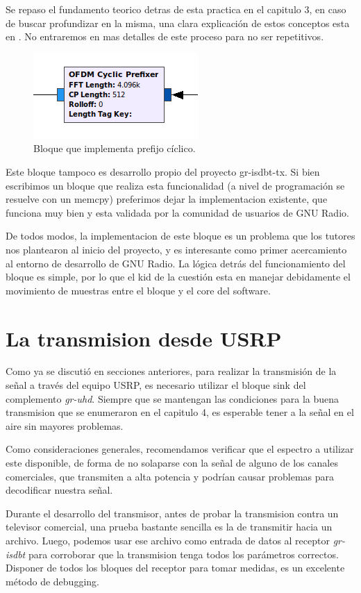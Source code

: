 Se repaso el fundamento teorico detras de esta practica en el capitulo 3, en caso de buscar profundizar en la misma, una clara explicación de estos conceptos esta en \cite{gr-isdbt}. No entraremos en mas detalles de este proceso para no ser repetitivos.

\begin{figure}[!h]
	\centering
	\includegraphics[scale=0.5]{figuras/cap05/cp}
	\caption{\label{f:cp} Bloque que implementa prefijo cíclico.}
\end{figure}

Este bloque tampoco es desarrollo propio del proyecto gr-isdbt-tx. Si bien escribimos un bloque que realiza esta funcionalidad (a nivel de programación se resuelve con un memcpy) preferimos dejar la implementacion existente, que funciona muy bien y esta validada por la comunidad de usuarios de GNU Radio.

De todos modos, la implementacion de este bloque es un problema que los tutores nos plantearon al inicio del proyecto, y es interesante como primer acercamiento al entorno de desarrollo de GNU Radio. La lógica detrás del funcionamiento del bloque es simple, por lo que el kid de la cuestión esta en manejar debidamente el movimiento de muestras entre el bloque y el core del software.

\section{La transmision desde USRP}

Como ya se discutió en secciones anteriores, para realizar la transmisión de la señal a través del equipo USRP, es necesario utilizar el bloque sink del complemento \textit{gr-uhd}. Siempre que se mantengan las condiciones para la buena transmision que se enumeraron en el capitulo 4, es esperable tener a la señal en el aire sin mayores problemas. 

Como consideraciones generales, recomendamos verificar que el espectro a utilizar este disponible, de forma de no solaparse con la señal de alguno de los canales comerciales, que transmiten a alta potencia y podrían causar problemas para decodificar nuestra señal.

Durante el desarrollo del transmisor, antes de probar la transmision contra un televisor comercial, una prueba bastante sencilla es la de transmitir hacia un archivo. Luego, podemos usar ese archivo como entrada de datos al receptor \textit{gr-isdbt} para corroborar que la transmision tenga todos los parámetros correctos. Disponer de todos los bloques del receptor para tomar medidas, es un excelente método de debugging.